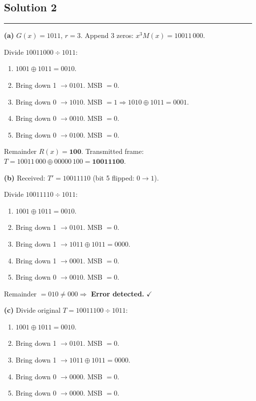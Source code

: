\documentclass[12pt]{article}
\begin{document}
\subsection*{Solution 2}
\hrule\medskip
\textbf{(a)} $G(x) = 1011$, $r = 3$. Append 3 zeros: $x^3 M(x) = 10011\,000$.

Divide $10011000 \div 1011$:

\begin{enumerate}
  \item $1001 \oplus 1011 = 0010$.
  \item Bring down 1 $\to 0101$. MSB $= 0$.
  \item Bring down 0 $\to 1010$. MSB $= 1 \Rightarrow 1010 \oplus 1011 = 0001$.
  \item Bring down 0 $\to 0010$. MSB $= 0$.
  \item Bring down 0 $\to 0100$. MSB $= 0$.
\end{enumerate}

Remainder $R(x) = \mathbf{100}$. Transmitted frame: $T = 10011\,000 \oplus 00000\,100 = \mathbf{10011100}$.

\medskip
\textbf{(b)} Received: $T' = 10011110$ (bit 5 flipped: $0 \to 1$).

Divide $10011110 \div 1011$:

\begin{enumerate}
  \item $1001 \oplus 1011 = 0010$.
  \item Bring down 1 $\to 0101$. MSB $= 0$.
  \item Bring down 1 $\to 1011 \oplus 1011 = 0000$.
  \item Bring down 1 $\to 0001$. MSB $= 0$.
  \item Bring down 0 $\to 0010$. MSB $= 0$.
\end{enumerate}

Remainder $= 010 \neq 000 \Rightarrow$ \textbf{Error detected.} $\checkmark$

\medskip
\textbf{(c)} Divide original $T = 10011100 \div 1011$:

\begin{enumerate}
  \item $1001 \oplus 1011 = 0010$.
  \item Bring down 1 $\to 0101$. MSB $= 0$.
  \item Bring down 1 $\to 1011 \oplus 1011 = 0000$.
  \item Bring down 0 $\to 0000$. MSB $= 0$.
  \item Bring down 0 $\to 0000$. MSB $= 0$.
\end{enumerate}
\end{document}
